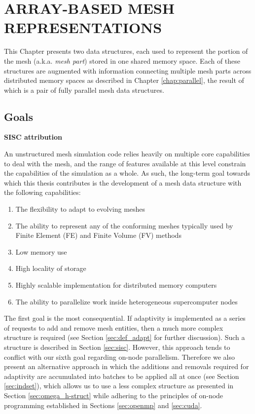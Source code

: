 
\chapter{ARRAY-BASED MESH REPRESENTATIONS}
\label{chap:struct}

This Chapter presents two data structures, each used to represent
the portion of the mesh (a.k.a. \emph{mesh part}) stored in one
shared memory space.
Each of these structures are augmented with information connecting multiple
mesh parts across distributed memory spaces as described in
Chapter \ref{chap:parallel}, the result of which is a pair of fully parallel
mesh data structures.

\section{Goals}
\label{sec:struct_goals}

{\bf SISC attribution}

An unstructured mesh simulation code relies heavily on
multiple core capabilities to deal with the mesh,
and the range of features available at this level constrain
the capabilities of the simulation as a whole.
As such, the long-term goal towards which this thesis
contributes is the development of a mesh data structure
with the following capabilities:

\begin{enumerate}
\item The flexibility to adapt to evolving meshes
\item The ability to represent any of the conforming meshes typically
used by Finite Element (FE) and Finite Volume (FV) methods
\item Low memory use
\item High locality of storage
\item Highly scalable implementation for distributed memory computers
\item The ability to parallelize work inside heterogeneous
supercomputer nodes
\end{enumerate}

The first goal is the most consequential.
If adaptivity is implemented as a series of requests to
add and remove mesh entities, then a much more complex structure is required
(see Section \ref{sec:def_adapt} for further discussion).
Such a structure is described in Section \ref{sec:sisc}.
However, this approach tends to conflict with our sixth goal regarding
on-node parallelism.
Therefore we also present an alternative
approach in which the additions and removals required for adaptivity
are accumulated into batches to be applied all at once
(see Section \ref{sec:indset}), which allows us to use a less complex structure
as presented in Section \ref{sec:omega_h-struct} while adhering to the
principles of on-node programming established in Sections
\ref{sec:openmp} and \ref{sec:cuda}.

